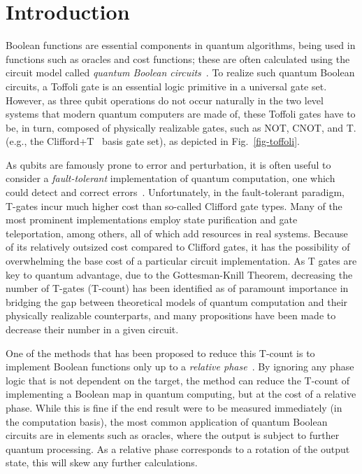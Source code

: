 \section{Introduction}

Boolean functions are  essential components in quantum algorithms, being used in functions such as oracles and cost functions; these are often calculated using the circuit model called {\it quantum Boolean circuits}~\cite{bib-ddmf}. To realize such quantum Boolean circuits, a Toffoli gate is an essential logic primitive in a universal gate set. However, as three qubit operations do not occur naturally in the two level systems that modern quantum computers are made of, these Toffoli gates have to be, in turn, composed of physically realizable gates, such as NOT, CNOT, and T. (e.g., the Clifford+T~\cite{bib-barenco-elementary} basis gate set), as depicted in Fig.~\ref{fig-toffoli}.

As qubits are famously prone to error and perturbation, it is often useful to consider a {\it fault-tolerant} implementation of quantum computation, one which could detect and correct errors~\cite{bib-mike-and-ike}. Unfortunately, in the fault-tolerant paradigm, T-gates incur much higher cost than so-called Clifford gate types. Many of the most prominent implementations employ state purification and gate teleportation, among others, all of which add resources in real systems. Because of its relatively outsized cost compared to Clifford gates, it has the possibility of overwhelming the base cost of a particular circuit implementation. As T gates are key to quantum advantage, due to the Gottesman-Knill Theorem, decreasing the number of T-gates (T-count) has been identified as of paramount importance in bridging the gap between theoretical models of quantum computation and their physically realizable counterparts, and many propositions have been made to decrease their number in a given circuit.

One of the methods that has been proposed to reduce this T-count is to implement Boolean functions only up to a {\it relative phase}~\cite{bib-barenco-elementary}. By ignoring any phase logic that is not dependent on the target, the method can reduce the T-count of implementing a Boolean map in quantum computing, but at the cost of a relative phase. While this is fine if the end result were to be measured immediately (in the computation basis), the most common application of quantum Boolean circuits are in elements such as oracles, where the output is subject to further quantum processing. As a relative phase corresponds to a rotation of the output state, this will skew any further calculations.

